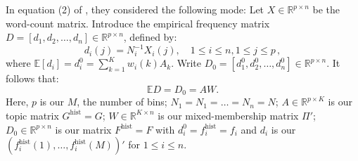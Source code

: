 \documentclass[preprint,11pt]{article}
\newcommand{\mbb}{\mathbb}
\numberwithin{equation}{section}
\begin{document}
In equation (2) of \cite{ke2024entry}, they considered the following mode: Let $X\in\mathbb{R}^{p\times n}$ be the word-count matrix.
Introduce the empirical frequency matrix $D=[d_1,d_2,\ldots,d_n]\in \mathbb{R}^{p\times n}$, defined by:
\begin{equation*}
d_i(j)= N_i^{-1}X_i(j), %
\quad 1\leq i\leq n, 1\leq j \leq p\, ,
\end{equation*}
where $\mathbb{E}[d_i]=d_i^0=\sum_{k=1}^Kw_i(k)A_k$. Write $D_0=[d_1^0, d_2^0,\ldots, d_n^0]\in\mathbb{R}^{p\times n}$. It follows that:
\[
\mathbb E D = D_0 = AW.
\]
Here, $p$ is our $M$, the number of bins; $N_1=N_1=\ldots=N_n=N$; $A\in\mbb{R}^{p\times K}$ is our topic matrix $G^{\text{hist}}=G$; $W\in\mbb{R}^{K\times n}$ is our mixed-membership matrix $\Pi'$; $D_0\in\mbb{R}^{p\times n}$ is our matrix $F^{\text{hist}}=F$ with $d_i^0 = f_i^{\text{hist}}=f_i$ and $d_i$ is our $(f_i^{\text{hist}}(1),\ldots,f_i^{\text{hist}}(M))'$ for $1\le i\le n$.
\end{document}
